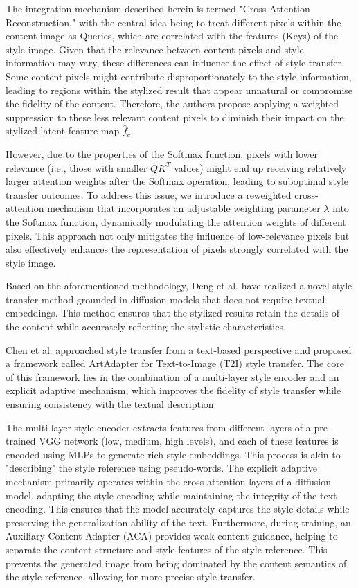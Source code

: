 \documentclass[preprint,12pt]{elsarticle}
\begin{document}
The integration mechanism described herein is termed "Cross-Attention Reconstruction," with the central idea being to treat different pixels within the content image as Queries, which are correlated with the features (Keys) of the style image. Given that the relevance between content pixels and style information may vary, these differences can influence the effect of style transfer. Some content pixels might contribute disproportionately to the style information, leading to regions within the stylized result that appear unnatural or compromise the fidelity of the content. Therefore, the authors propose applying a weighted suppression to these less relevant content pixels to diminish their impact on the stylized latent feature map $\hat f_c$.

However, due to the properties of the Softmax function, pixels with lower relevance (i.e., those with smaller  $QK^T$ values) might end up receiving relatively larger attention weights after the Softmax operation, leading to suboptimal style transfer outcomes. To address this issue, we introduce a reweighted cross-attention mechanism that incorporates an adjustable weighting parameter $\lambda$ into the Softmax function, dynamically modulating the attention weights of different pixels. This approach not only mitigates the influence of low-relevance pixels but also effectively enhances the representation of pixels strongly correlated with the style image.

Based on the aforementioned methodology, Deng et al. have realized a novel style transfer method grounded in diffusion models that does not require textual embeddings. This method ensures that the stylized results retain the details of the content while accurately reflecting the stylistic characteristics.

Chen et al.\citep{105chen2024artadapter} approached style transfer from a text-based perspective and proposed a framework called ArtAdapter for Text-to-Image (T2I) style transfer. The core of this framework lies in the combination of a multi-layer style encoder and an explicit adaptive mechanism, which improves the fidelity of style transfer while ensuring consistency with the textual description.

The multi-layer style encoder extracts features from different layers of a pre-trained VGG network (low, medium, high levels), and each of these features is encoded using MLPs to generate rich style embeddings. This process is akin to "describing" the style reference using pseudo-words. The explicit adaptive mechanism primarily operates within the cross-attention layers of a diffusion model, adapting the style encoding while maintaining the integrity of the text encoding. This ensures that the model accurately captures the style details while preserving the generalization ability of the text. Furthermore, during training, an Auxiliary Content Adapter (ACA) provides weak content guidance, helping to separate the content structure and style features of the style reference. This prevents the generated image from being dominated by the content semantics of the style reference, allowing for more precise style transfer.
\end{document}
